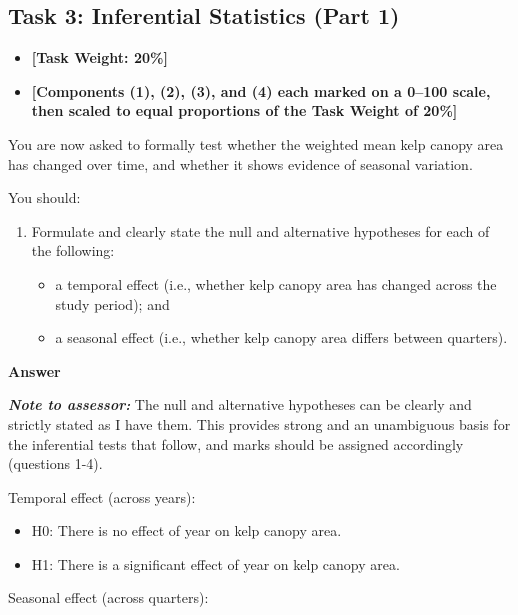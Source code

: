 \documentclass[
  british,
  10pt,
]{article}
\providecommand{\tightlist}{%
  \setlength{\itemsep}{0pt}\setlength{\parskip}{0pt}}
\begin{document}
\subsection{Task 3: Inferential Statistics (Part
1)}\label{task-3-inferential-statistics-part-1}

\begin{itemize}
\tightlist
\item
  \textbf{{[}Task Weight: 20\%{]}}
\item
  \textbf{{[}Components (1), (2), (3), and (4) each marked on a 0--100
  scale, then scaled to equal proportions of the Task Weight of 20\%{]}}
\end{itemize}

You are now asked to formally test whether the weighted mean kelp canopy
area has changed over time, and whether it shows evidence of seasonal
variation.

You should:

\begin{enumerate}
\def\labelenumi{\arabic{enumi}.}
\tightlist
\item
  Formulate and clearly state the null and alternative hypotheses for
  each of the following:

  \begin{itemize}
  \tightlist
  \item
    a temporal effect (i.e., whether kelp canopy area has changed across
    the study period); and
  \item
    a seasonal effect (i.e., whether kelp canopy area differs between
    quarters).
  \end{itemize}
\end{enumerate}

\textbf{Answer}

\textbf{\emph{Note to assessor:}} The null and alternative hypotheses
can be clearly and strictly stated as I have them. This provides strong
and an unambiguous basis for the inferential tests that follow, and
marks should be assigned accordingly (questions 1-4).

Temporal effect (across years):

\begin{itemize}
\tightlist
\item
  H0: There is no effect of year on kelp canopy area.
\item
  H1: There is a significant effect of year on kelp canopy area.
\end{itemize}

Seasonal effect (across quarters):
\end{document}
